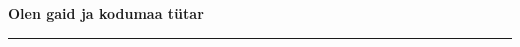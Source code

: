 \documentclass[10pt]{book}
\begin{document}
{
  \samepage
  \raggedbottom
  \raggedright
  \sloppy


  \vspace{0.2in}

  \noindent\begin{minipage}{.1\textwidth}
    \hfill\vspace{0.1in}
  \end{minipage}%
  \noindent\begin{minipage}{.8\textwidth}
    \centering
    \bfseries
    \large Olen gaid ja kodumaa t\"utar
  \end{minipage}%
  \noindent\begin{minipage}{.1\textwidth}
      \hfill\vspace{0.1in}
  \end{minipage}

  \nopagebreak[4]
  \vspace{0.1in}
  \nopagebreak[4]
  \hrule height 0.05ex
  \nopagebreak[4]
  \vspace{-0.05in}




}
\end{document}

